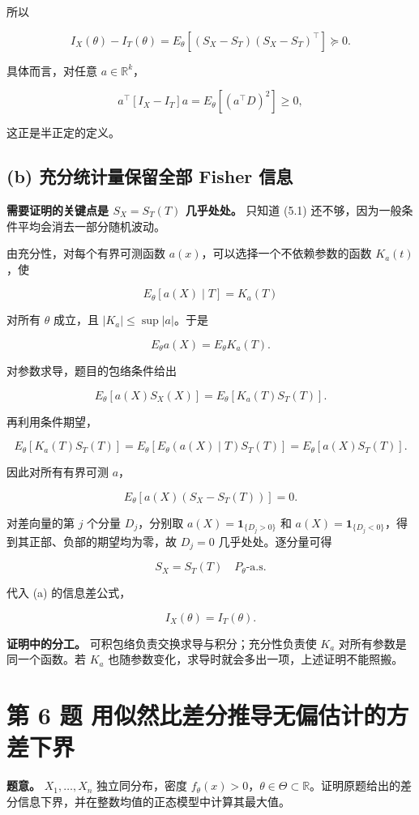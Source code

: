 所以

\[
\boxed{I_X(\theta)-I_T(\theta)
=E_\theta[(S_X-S_T)(S_X-S_T)^\top]\succeq0.}
\]

具体而言，对任意 $a\in\mathbb R^k$，

\[
a^\top[I_X-I_T]a
=E_\theta[(a^\top D)^2]\ge0,
\]

这正是半正定的定义。

\subsection{(b) 充分统计量保留全部 Fisher 信息}

\textbf{需要证明的关键点是 $S_X=S_T(T)$ 几乎处处。} 只知道 (5.1) 还不够，因为一般条件平均会消去一部分随机波动。

由充分性，对每个有界可测函数 $a(x)$，可以选择一个不依赖参数的函数 $K_a(t)$，使

\[
E_\theta[a(X)\mid T]=K_a(T)
\]

对所有 $\theta$ 成立，且 $|K_a|\le\sup|a|$。于是

\[
E_\theta a(X)=E_\theta K_a(T).
\]

对参数求导，题目的包络条件给出

\[
E_\theta[a(X)S_X(X)]
=E_\theta[K_a(T)S_T(T)].
\]

再利用条件期望，

\[
E_\theta[K_a(T)S_T(T)]
=E_\theta[E_\theta(a(X)\mid T)S_T(T)]
=E_\theta[a(X)S_T(T)].
\]

因此对所有有界可测 $a$，

\[
E_\theta[a(X)(S_X-S_T(T))]=0.
\]

对差向量的第 $j$ 个分量 $D_j$，分别取 $a(X)=\mathbf1_{\{D_j>0\}}$ 和 $a(X)=\mathbf1_{\{D_j<0\}}$，得到其正部、负部的期望均为零，故 $D_j=0$ 几乎处处。逐分量可得

\[
S_X=S_T(T)\quad P_\theta\text{-a.s.}
\]

代入 (a) 的信息差公式，

\[
\boxed{I_X(\theta)=I_T(\theta).}
\]

\textbf{证明中的分工。} 可积包络负责交换求导与积分；充分性负责使 $K_a$ 对所有参数是同一个函数。若 $K_a$ 也随参数变化，求导时就会多出一项，上述证明不能照搬。

\section{第 6 题 用似然比差分推导无偏估计的方差下界}

\textbf{题意。} $X_1,\ldots,X_n$ 独立同分布，密度 $f_\theta(x)>0$，$\theta\in\Theta\subset\mathbb R$。证明原题给出的差分信息下界，并在整数均值的正态模型中计算其最大值。

